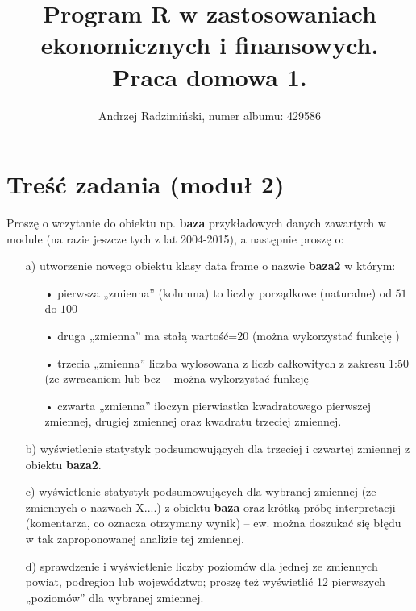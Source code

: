 

\title{Program R w zastosowaniach ekonomicznych i finansowych. Praca domowa 1.}
\author{Andrzej Radzimiński, numer albumu: 429586}
\date{}



\renewcommand{\contentsname}{Spis treści}

\setlength{\parindent}{0pt}
\noindent

\maketitle



\section*{Treść zadania (moduł 2)}

Proszę o wczytanie do obiektu np. \textbf{baza} przykładowych danych zawartych w module (na razie
jeszcze tych z lat 2004-2015), a następnie proszę o:

\begin{itemize}
    \item[a)] utworzenie nowego obiektu klasy data frame o nazwie \textbf{baza2} w którym:
    \begin{itemize}
        \item[•] pierwsza „zmienna” (kolumna) to liczby porządkowe (naturalne) od $51$ do $100$
        \item[•] druga „zmienna” ma stałą wartość=20 (można wykorzystać funkcję )
        \item[•] trzecia „zmienna” liczba wylosowana z liczb całkowitych z zakresu 1:50 (ze
zwracaniem lub bez -- można wykorzystać funkcję 
        \item[•] czwarta „zmienna” iloczyn pierwiastka kwadratowego pierwszej zmiennej, drugiej
zmiennej oraz kwadratu trzeciej zmiennej.
    \end{itemize}
    \item[b)] wyświetlenie statystyk podsumowujących dla trzeciej i czwartej zmiennej z obiektu \textbf{baza2}.
    \item[c)] wyświetlenie statystyk podsumowujących dla wybranej zmiennej (ze zmiennych o
nazwach X....) z obiektu \textbf{baza} oraz krótką próbę interpretacji (komentarza, co oznacza
    otrzymany wynik) -- ew. można doszukać się błędu w tak zaproponowanej analizie tej zmiennej.
    \item[d)] sprawdzenie i wyświetlenie liczby poziomów dla jednej ze zmiennych powiat, podregion
lub województwo; proszę też wyświetlić 12 pierwszych „poziomów” dla wybranej
zmiennej.
\end{itemize}

